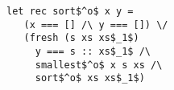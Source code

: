 

\begin{figure}[h]
  \centering
  \begin{minipage}{0.65\columnwidth}
    \begin{lstlisting}[frame=tb,language=ocanren1]
 let rec sort$^o$ x y =
   (x === [] /\ y === []) \/ 
   (fresh (s xs xs$_1$)
     y === s :: xs$_1$ /\
     smallest$^o$ x s xs /\
     sort$^o$ xs xs$_1$)
    \end{lstlisting}
  \end{minipage}
\end{figure}
